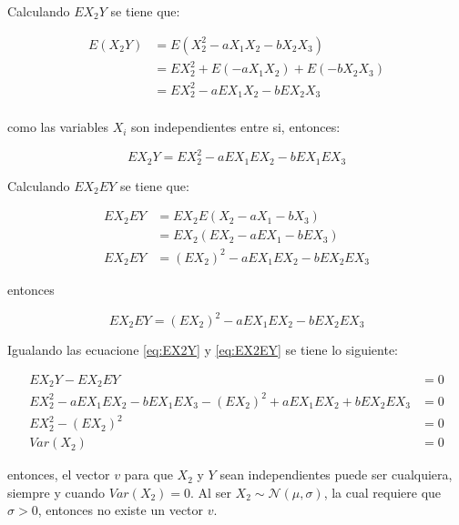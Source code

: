 \begin{enumerate}
          Calculando $EX_2Y$ se tiene que:

          \begin{align*}
              E(X_2Y) & = E(X_2^2-aX_1X_2-bX_2X_3)       \\
                      & = EX_2^2+E(-aX_1X_2)+E(-bX_2X_3) \\
                      & = EX_2^2-aEX_1X_2-bEX_2X_3       \\
          \end{align*}

          como las variables $X_i$ son independientes entre si, entonces:

          \begin{equation}
              EX_2Y = EX_2^2-aEX_1EX_2-bEX_1EX_3 \label{eq:EX2Y}
          \end{equation}

          Calculando $EX_2EY$ se tiene que:


          \begin{align*}
              EX_2EY & = EX_2 E(X_2-aX_1-bX_3)           \\
                     & =EX_2( EX_2-aEX_1-bEX_3)          \\
              EX_2EY & = (EX_2)^2 -aEX_1EX_2 - bEX_2EX_3
          \end{align*}

          entonces

          \begin{equation}
              EX_2EY  = (EX_2)^2 -aEX_1EX_2 - bEX_2EX_3 \label{eq:EX2EY}
          \end{equation}

          Igualando las ecuacione \ref{eq:EX2Y} y \ref{eq:EX2EY} se tiene lo siguiente:

          \begin{align*}
              EX_2Y                     - EX_2EY                          & =0  \\
              EX_2^2-aEX_1EX_2-bEX_1EX_3 -(EX_2)^2 +aEX_1EX_2 + bEX_2EX_3 & = 0 \\
              EX_2^2 -(EX_2)^2                                            & =0  \\
              Var(X_2)                                                    & =0
          \end{align*}

          entonces, el vector $v$ para que $X_2$ y $Y$ sean independientes puede ser cualquiera, siempre y cuando $Var(X_2)=0$. Al ser $X_2 \sim \mathcal{N}(\mu,\sigma)$, la cual requiere que $\sigma>0$, entonces no existe un vector $v$.
\end{enumerate}